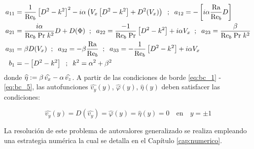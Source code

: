 \begin{align*}
a_{11} &= \frac{1}{\text{Re}_b} \left[ D^2 - k^2 \right]^2 - i \alpha \left( V_x \left[ D^2 - k^2 \right] + D^2(V_x)\right) \hspace{2mm} ; \hspace{2mm} a_{12} = -\left[ i \alpha \frac{\text{Ra}}{\text{Re}_b} D \right] \\
a_{21} &= \frac{i \alpha}{\text{Re}_b \hspace{1mm} \text{Pr} \hspace{1mm} k^2} D + D(\Phi) \hspace{2mm} ; \hspace{2mm} a_{22} = \frac{-1}{\text{Re}_b \hspace{1mm} \text{Pr} } \left[ D^2 - k^2 \right] + i \alpha V_x  \hspace{2mm} ; \hspace{2mm} a_{23} = \frac{\beta}{\text{Re}_b \hspace{1mm} \text{Pr} \hspace{1mm} k^2} \\
a_{31} &= \beta D(V_x) \hspace{2mm} ; \hspace{2mm} a_{32} = - \beta \frac{\text{Ra}}{\text{Re}_b}  \hspace{2mm} ; \hspace{2mm} a_{33} = -\frac{1}{\text{Re}_b} \left[ D^2 - k^2 \right] + i \alpha V_x \\
b_1    &= - \left[ D^2 - k^2 \right] \hspace{2mm} ; \hspace{2mm} k^2 = \alpha^2 + \beta^2 \\
\end{align*}
donde $\widehat{\eta} := \beta \hspace{0.5mm} \widehat{v_x} - \alpha \hspace{0.5mm} \widehat{v_z}$. A partir de las condiciones de borde \ref{eq:bc_1} - \ref{eq:bc_5}, las autofunciones $\widehat{v_y}(y)$, $\widehat{\varphi}(y)$, $\widehat{\eta}(y)$ deben satisfacer las condiciones:

\begin{equation}
\widehat{v_y}(y) = D(\widehat{v_y}) = \widehat{\varphi}(y) = \widehat{\eta}(y) = 0 \quad \text{en} \quad y= \pm 1
\label{eq:eigensis-ci}
\end{equation} 

La resolución de este problema de autovalores generalizado se realiza empleando una estrategia numérica la cual se detalla en el Capítulo \ref{cap:numerico}. 

